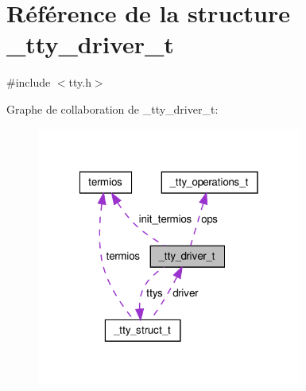 \hypertarget{struct__tty__driver__t}{\section{\-Référence de la structure \-\_\-tty\-\_\-driver\-\_\-t}
\label{struct__tty__driver__t}
}


{\ttfamily \#include $<$tty.\-h$>$}



\-Graphe de collaboration de \-\_\-tty\-\_\-driver\-\_\-t\-:\nopagebreak
\begin{figure}[H]
\begin{center}
\leavevmode
\includegraphics[width=247pt]{struct__tty__driver__t__coll__graph}
\end{center}
\end{figure}
